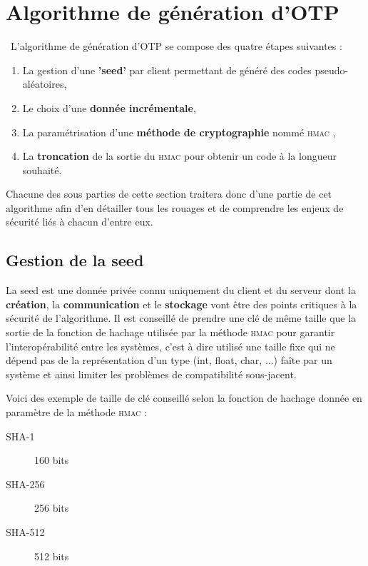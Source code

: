 \documentclass[a4paper, 10pt]{article}
\newcommand{\otp}{\textsc{OTP} }
\newcommand{\hmac}{\textsc{hmac} }
\begin{document}
\newpage
    \section{Algorithme de génération d'\otp}

\noindent\ L'algorithme de génération d'\otp se compose des quatre étapes suivantes :
    \begin{enumerate}
        \item La gestion d'une \textbf{'seed'} par client permettant de généré des codes pseudo-aléatoires,
        \item Le choix d'une \textbf{donnée incrémentale},
        \item La paramétrisation d'une \textbf{méthode de cryptographie} nommé \hmac,
        \item La \textbf{troncation} de la sortie du \hmac pour obtenir un code à la longueur souhaité.\\
    \end{enumerate}

    Chacune des sous parties de cette section traitera donc d'une partie de cet algorithme afin d'en détailler tous les rouages et de comprendre les enjeux de sécurité liés à chacun d'entre eux.

    \subsection{Gestion de la seed}

    La seed est une \textcolor{myblue}{donnée privée} connu uniquement du client et du serveur dont la \textbf{\textcolor{myblue}{création}}, la \textbf{\textcolor{myblue}{communication}} et le \textbf{\textcolor{myblue}{stockage}} vont être des points critiques à la \textcolor{mygreen}{sécurité de l’algorithme}. 
Il est conseillé de prendre une \textcolor{myblue}{clé de même taille que la sortie de la fonction de hachage} utilisée par la méthode \hmac pour garantir l’\textcolor{mygreen}{interopérabilité} entre les systèmes, 
c'est à dire utilisé une taille fixe qui ne dépend pas de la représentation d'un type (int, float, char, ...) faîte par un système et ainsi limiter les problèmes de compatibilité
sous-jacent.

Voici des exemple de taille de clé conseillé selon la fonction de hachage donnée en paramètre de la méthode \hmac :
\begin{description}
    \item[SHA-1] 160 bits
    \item[SHA-256] 256 bits
    \item[SHA-512] 512 bits    
\end{description}
\end{document}

